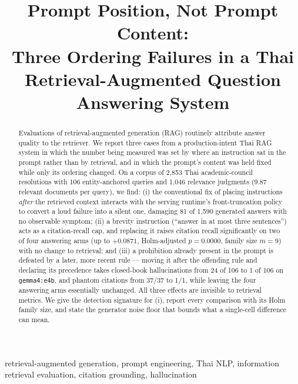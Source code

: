 \documentclass[conference]{IEEEtran}
\begin{document}
\title{Prompt Position, Not Prompt Content:\\
Three Ordering Failures in a Thai\\
Retrieval-Augmented Question Answering System}

\author{
}

\maketitle

\begin{abstract}
Evaluations of retrieval-augmented generation (RAG) routinely attribute answer
quality to the retriever. We report three cases from a production-intent Thai
RAG system in which the number being measured was set by where an instruction
sat in the prompt rather than by retrieval, and in which the prompt's content
was held fixed while only its ordering changed. On a corpus of 2{,}853 Thai
academic-council resolutions with 106 entity-anchored queries and 1{,}046
relevance judgments (9.87 relevant documents per query), we find: (i) the
conventional fix of placing instructions \emph{after} the retrieved context
interacts with the serving runtime's front-truncation policy to convert a loud
failure into a silent one, damaging 81 of 1{,}590 generated answers with no
observable symptom; (ii) a brevity instruction (``answer in at most three
sentences'') acts as a citation-recall cap, and replacing it raises citation
recall significantly on two of four answering arms (up to $+0.0871$,
Holm-adjusted $p=0.0000$, family size $m=9$) with no change to retrieval; and
(iii) a prohibition already present in the prompt is defeated by a later,
more recent rule --- moving it after the offending rule and declaring its
precedence takes closed-book hallucinations from 24 of 106 to 1 of 106 on
\texttt{gemma4:e4b}, and phantom citations from 37/37 to 1/1, while leaving the
four answering arms essentially unchanged. All three effects are invisible to
retrieval metrics. We give the detection signature for (i), report every
comparison with its Holm family size, and state the generator noise floor that
bounds what a single-cell difference can mean.
\end{abstract}

\begin{IEEEkeywords}
retrieval-augmented generation, prompt engineering, Thai NLP, information
retrieval evaluation, citation grounding, hallucination
\end{IEEEkeywords}
\end{document}

